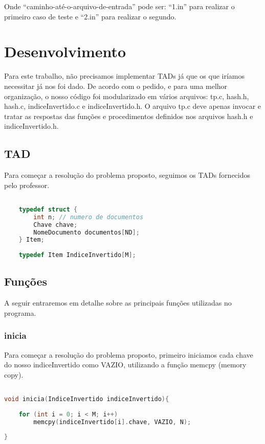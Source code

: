\documentclass{article}
\begin{document}
Onde “caminho-até-o-arquivo-de-entrada” pode ser: “1.in” para realizar o primeiro caso de teste e “2.in” para realizar o segundo.

\clearpage

\section{Desenvolvimento}

Para este trabalho, não precisamos implementar TADs já que os que iríamos necessitar já nos foi dado. 
De acordo com o pedido, e para uma melhor organização, o nosso código foi modularizado em vários arquivos: tp.c, hash.h, hash.c, indiceInvertido.c e indiceInvertido.h. 
O arquivo tp.c deve apenas invocar e tratar as respostas das funções e procedimentos definidos nos arquivos hash.h e indiceInvertido.h.

\subsection{TAD}
Para começar a resolução do problema proposto, seguimos os TADs fornecidos pelo professor.

\begin{lstlisting}[caption={TADs},label={lst:cod1},language=C]

    typedef struct {
        int n; // numero de documentos
        Chave chave;
        NomeDocumento documentos[ND];
    } Item;
    
    typedef Item IndiceInvertido[M];

\end{lstlisting}

\subsection{Funções}

A seguir entraremos em detalhe sobre as principais funções utilizadas no programa.

\subsubsection{inicia}

Para começar a resolução do problema proposto, primeiro iniciamos cada chave do nosso
indiceInvertido como VAZIO, utilizando a função memcpy (memory copy).

\begin{lstlisting}[caption={Função inicia},label={lst:cod2},language=C]

void inicia(IndiceInvertido indiceInvertido){
    
    for (int i = 0; i < M; i++)
        memcpy(indiceInvertido[i].chave, VAZIO, N);
    
}

\end{lstlisting}
\end{document}
